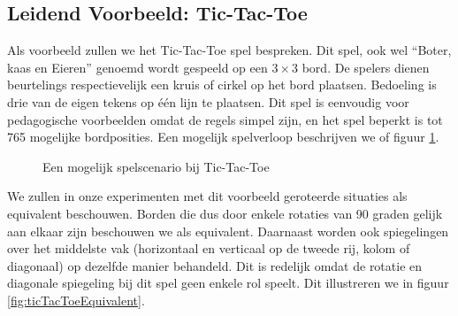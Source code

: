 \subsection{Leidend Voorbeeld: Tic-Tac-Toe}
\begin{leftbar}
Als voorbeeld zullen we het Tic-Tac-Toe spel bespreken. Dit spel, ook wel ``Boter, kaas en Eieren'' genoemd wordt gespeeld op een $3\times3$ bord. De spelers dienen beurtelings respectievelijk een kruis of cirkel op het bord plaatsen. Bedoeling is drie van de eigen tekens op één lijn te plaatsen. Dit spel is eenvoudig voor pedagogische voorbeelden omdat de regels simpel zijn, en het spel beperkt is tot 765 mogelijke bordposities. Een mogelijk spelverloop beschrijven we of figuur \ref{fig:ticTacToeExample}.
\end{leftbar}
\begin{figure}[htb]
\centering
{}
\caption{Een mogelijk spelscenario bij Tic-Tac-Toe}
\label{fig:ticTacToeExample}
\end{figure}
\begin{leftbar}
We zullen in onze experimenten met dit voorbeeld geroteerde situaties als equivalent beschouwen. Borden die dus door enkele rotaties van 90 graden gelijk aan elkaar zijn beschouwen we als equivalent. Daarnaast worden ook spiegelingen over het middelste vak (horizontaal en verticaal op de tweede rij, kolom of diagonaal) op dezelfde manier behandeld. Dit is redelijk omdat de rotatie en diagonale spiegeling bij dit spel geen enkele rol speelt. Dit illustreren we in figuur \ref{fig:ticTacToeEquivalent}.
\end{leftbar}
